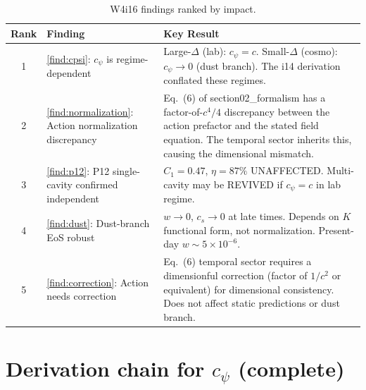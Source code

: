 \documentclass[11pt]{article}
\newcommand{\ee}[1]{\times 10^{#1}}
\begin{document}
\begin{table}[H]
\centering
\caption{W4i16 findings ranked by impact.}
\begin{tabular}{@{}clp{8cm}@{}}
\toprule
Rank & Finding & Key Result \\
\midrule
1 & \ref{find:cpsi}: $c_\psi$ is regime-dependent &
  Large-$\Delta$ (lab): $c_\psi = c$.
  Small-$\Delta$ (cosmo): $c_\psi \to 0$ (dust branch).
  The i14 derivation conflated these regimes. \\
2 & \ref{find:normalization}: Action normalization discrepancy &
  Eq.~(6) of section02\_formalism has a factor-of-$c^4/4$ discrepancy
  between the action prefactor and the stated field equation.
  The temporal sector inherits this, causing the dimensional mismatch. \\
3 & \ref{find:p12}: P12 single-cavity confirmed independent &
  $C_1 = 0.47$, $\eta = 87\%$ UNAFFECTED.
  Multi-cavity may be REVIVED if $c_\psi = c$ in lab regime. \\
4 & \ref{find:dust}: Dust-branch EoS robust &
  $w \to 0$, $c_s \to 0$ at late times. Depends on $K$ functional
  form, not normalization. Present-day $w \sim 5\ee{-6}$. \\
5 & \ref{find:correction}: Action needs correction &
  Eq.~(6) temporal sector requires a dimensionful correction
  (factor of $1/c^2$ or equivalent) for dimensional consistency.
  Does not affect static predictions or dust branch. \\
\bottomrule
\end{tabular}
\end{table}

\section{Derivation chain for $c_\psi$ (complete)}
\end{document}
